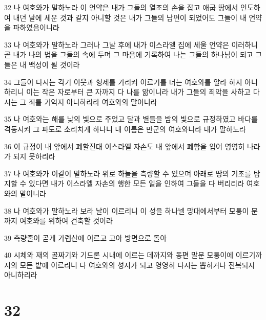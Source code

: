 \par 32 나 여호와가 말하노라 이 언약은 내가 그들의 열조의 손을 잡고 애굽 땅에서 인도하여 내던 날에 세운 것과 같지 아니할 것은 내가 그들의 남편이 되었어도 그들이 내 언약을 파하였음이니라
\par 33 나 여호와가 말하노라 그러나 그날 후에 내가 이스라엘 집에 세울 언약은 이러하니 곧 내가 나의 법을 그들의 속에 두며 그 마음에 기록하여 나는 그들의 하나님이 되고 그들은 내 백성이 될 것이라
\par 34 그들이 다시는 각기 이웃과 형제를 가리켜 이르기를 너는 여호와를 알라 하지 아니하리니 이는 작은 자로부터 큰 자까지 다 나를 앎이니라 내가 그들의 죄악을 사하고 다시는 그 죄를 기억지 아니하리라 여호와의 말이니라
\par 35 나 여호와는 해를 낮의 빛으로 주었고 달과 별들을 밤의 빛으로 규정하였고 바다를 격동시켜 그 파도로 소리치게 하나니 내 이름은 만군의 여호와니라 내가 말하노라
\par 36 이 규정이 내 앞에서 폐할진대 이스라엘 자손도 내 앞에서 폐함을 입어 영영히 나라가 되지 못하리라
\par 37 나 여호와가 이같이 말하노라 위로 하늘을 측량할 수 있으며 아래로 땅의 기초를 탐지할 수 있다면 내가 이스라엘 자손의 행한 모든 일을 인하여 그들을 다 버리리라 여호와의 말이니라
\par 38 나 여호와가 말하노라 보라 날이 이르리니 이 성을 하나넬 망대에서부터 모퉁이 문까지 여호와를 위하여 건축할 것이라
\par 39 측량줄이 곧게 가렙산에 이르고 고아 방면으로 돌아
\par 40 시체와 재의 골짜기와 기드론 시내에 이르는 데까지와 동편 말문 모퉁이에 이르기까지의 모든 밭에 이르리니 다 여호와의 성지가 되고 영영히 다시는 뽑히거나 전복되지 아니하리라

\chapter{32}


